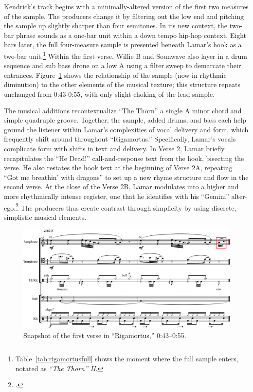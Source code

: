 Kendrick's track begins with a minimally-altered version of the first two measures of the 
sample. The producers change it by filtering out the low end and pitching the sample up 
slightly  sharper than four semitones. In its new context, the two-bar phrase sounds as a
one-bar unit within a down tempo hip-hop context. Eight bars later, the full four-measure
sample is presented beneath Lamar's hook as a two-bar unit.\footnote{
    Table~\ref{tab:rigamortusfull} shows the moment where the full sample enters, notated
    as \textit{``The Thorn'' II}.}
Within the first verse, Willie B and Sounwave also layer in a drum sequence and sub bass 
drone on a low A using a filter sweep to demarcate their entrances. 
Figure~\ref{fig:rigamortusnoslip} shows the relationship of the sample (now in rhythmic
diminution) to the other elements of the musical texture; this structure repeats unchanged 
from 0:43-0:55, with only slight choking of the lead sample.

The musical additions recontextualize ``The Thorn'' a single A minor chord and simple quadruple
groove. Together, the sample, added drums, and bass each help ground the listener within Lamar's
complexities of vocal delivery and form, which frequently shift around throughout ``Rigamortus.''
Specifically, Lamar's vocals complicate form with shifts in text and delivery. In Verse 2, Lamar
briefly recapitulates the ``He Dead!'' call-and-response text from the hook, bisecting the verse.
He also restates the hook text at the beginning of Verse 2A, repeating ``Got me breathin' with 
dragons'' to set up a new rhyme structure and flow in the second verse. At the close of the Verse
2B, Lamar modulates into a higher and more rhythmically intense register, one that he identifies with 
his ``Gemini'' alter-ego.\footnote{
    \cite{chrismenchTrackingManyVoices2017}.}
The producers thus create contrast through simplicity by using discrete, simplistic musical elements.

\begin{figure}[ht]
    \centering
    \includegraphics[width=\textwidth]{images/figures/chp 02/043053rigamortusnoslip.pdf}
    \caption{Snapshot of the first verse in ``Rigamortus,'' 0:43--0:55.}
    \label{fig:rigamortusnoslip}
\end{figure}

